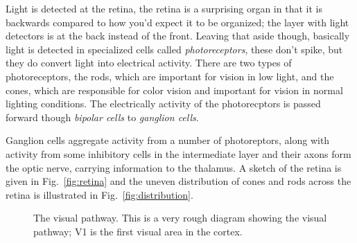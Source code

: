 \documentclass[11pt,a4paper]{scrartcl}
\begin{document}
Light is detected at the retina, the retina is a surprising organ in
that it is backwards compared to how you'd expect it to be organized;
the layer with light detectors is at the back instead of the
front. Leaving that aside though, basically light is detected in
specialized cells called \textsl{photoreceptors}, these don't spike,
but they do convert light into electrical activity. There are two
types of photoreceptors, the rods, which are important for vision in
low light, and the cones, which are responsible for color vision and
important for vision in normal lighting conditions. The electrically
activity of the photorecptors is passed forward though \textsl{bipolar
  cells} to \textsl{ganglion cells}.

Ganglion cells aggregate activity from a number of photoreptors, along
with activity from some inhibitory cells in the intermediate layer and
their axons form the optic nerve, carrying information to the
thalamus. A sketch of the retina is given in Fig.~\ref{fig:retina} and the uneven distribution of cones and rods across the retina is illustrated in Fig.~\ref{fig:distribution}.

\begin{figure}
\begin{center}
\end{center}
\caption{The visual pathway. This is a very rough diagram showing the visual pathway; V1 is the first visual area in the cortex.\label{fig:pathway}}
\end{figure}
\end{document}
